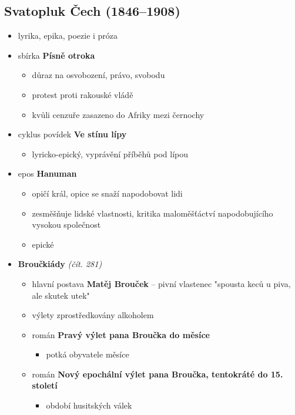 \subsection{Svatopluk Čech (1846--1908)}
\begin{itemize}
\item lyrika, epika, poezie i próza
\item sbírka \textbf{Písně otroka}
	\begin{itemize}
	\item důraz na osvobození, právo, svobodu
	\item protest proti rakouské vládě
	\item kvůli cenzuře zasazeno do Afriky mezi černochy
	\end{itemize}
\item cyklus povídek \textbf{Ve stínu lípy}
	\begin{itemize}
	\item lyricko-epický, vyprávění příběhů pod lípou
	\end{itemize}
\item epos \textbf{Hanuman}
	\begin{itemize}
	\item opičí král, opice se snaží napodobovat lidi
	\item zesměšňuje lidské vlastnosti, kritika maloměšťáctví napodobujícího vysokou společnost
	\item epické
	\end{itemize}		
\item \textbf{Broučkiády} \textit{(čít. 281)}
	\begin{itemize}
	\item hlavní postava \textbf{Matěj Brouček} -- pivní vlastenec "spousta keců u piva, ale skutek utek"
	\item výlety zprostředkovány alkoholem
	\item román \textbf{Pravý výlet pana Broučka do měsíce}
		\begin{itemize}
		\item potká obyvatele měsíce
		\end{itemize}
	\item román \textbf{Nový epochální výlet pana Broučka, tentokráté do 15. století}
		\begin{itemize}
		\item období husitských válek
		\end{itemize}
	\end{itemize}
\end{itemize}

